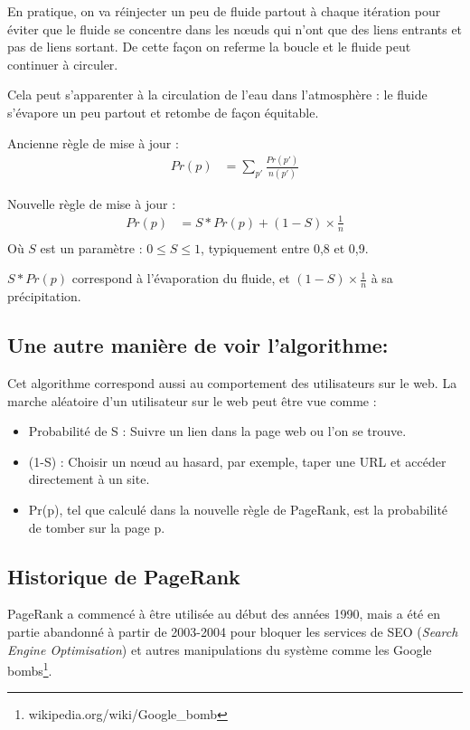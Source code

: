 	En pratique, on va réinjecter un peu de fluide partout à chaque itération pour éviter que le fluide se concentre dans les nœuds qui n'ont que des liens entrants et pas de liens sortant. De cette façon on referme la boucle et le fluide peut continuer à circuler.

 	Cela peut s'apparenter à la circulation de l'eau dans l'atmosphère : le fluide s'évapore un peu partout et retombe de façon équitable.

	Ancienne règle de mise à jour :
	\begin{align*}
		Pr(p) &=  \sum_ {p'}\frac{Pr(p')}{n(p')}
	\end{align*}

 	Nouvelle règle de mise à jour : \\
	\begin{align*}
		Pr(p) &= S*Pr(p) + (1-S)  \times \frac{1}{n} \\
	\end{align*}
	 Où $S$ est un paramètre : $ 0 \le S \le 1 $, typiquement entre 0,8 et 0,9.

	$S*Pr(p)$ correspond à l'évaporation du fluide, et $(1-S)  \times \frac{1}{n}$ à sa précipitation.

\subsection*{ Une autre manière de voir l'algorithme:}
    Cet algorithme correspond aussi au comportement des utilisateurs sur le web. La marche aléatoire d'un utilisateur sur le web peut être vue comme : 
	\begin{itemize}
        \item Probabilité de S : Suivre un lien dans la page web ou l'on se trouve.
        \item (1-S) : Choisir un n\oe ud au hasard, par exemple, taper une URL et accéder directement à un site.
        \item Pr(p), tel que calculé dans la nouvelle règle de PageRank, est la probabilité de tomber sur la page p.
	\end{itemize}

\subsection*{Historique de PageRank}

	PageRank a commencé à être utilisée au début des années 1990, mais a été en partie abandonné à partir de 2003-2004 pour bloquer les services de SEO (\textit{Search Engine Optimisation}) et autres manipulations du système comme les Google bombs\footnote{wikipedia.org/wiki/Google\_bomb}.

